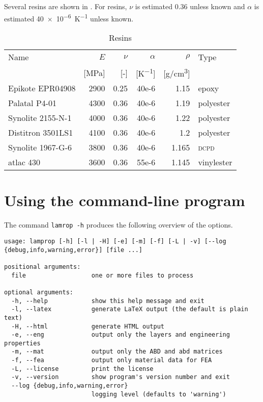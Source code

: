 \documentclass[a4paper,landscape,oneside,11pt,twocolumn]{memoir}
\begin{document}
Several resins are shown in . For resins, $\nu$ is estimated
0.36 unless known and $\alpha$ is estimated \SI{40e-6}{K^{-1}} unless known.

\begin{table}[!htbp]
  \centering
  \caption{\label{tb:resins}Resins}
  \begin{tabular}{lrrrrl}%
      Name & $E$ & $\nu$ & $\alpha$ & $\rho$ & Type\\
      & [\si{MPa}] & [-] & [\si{K^{-1}}] & [\si{g/cm^3}]\\
    \midrule
      Epikote EPR04908 & 2900 & 0.25 & 40e-6 & 1.15 & epoxy\\
      Palatal P4-01 & 4300 & 0.36 & 40e-6 & 1.19 & polyester\\
      Synolite 2155-N-1 & 4000 & 0.36 & 40e-6 & 1.22 & polyester\\
      Distitron 3501LS1 & 4100 & 0.36 & 40e-6 & 1.2 & polyester\\
      Synolite 1967-G-6 & 3800 & 0.36 & 40e-6 & 1.165 & \textsc{dcpd}\\
      atlac 430 & 3600 & 0.36 & 55e-6 & 1.145 & vinylester\\
  \end{tabular}
\end{table}

\section{Using the command-line program} %

The command \texttt{lamrop -h} produces the following overview of the options.

\begin{lstlisting}[style=plain]
usage: lamprop [-h] [-l | -H] [-e] [-m] [-f] [-L | -v] [--log {debug,info,warning,error}] [file ...]

positional arguments:
  file                  one or more files to process

optional arguments:
  -h, --help            show this help message and exit
  -l, --latex           generate LaTeX output (the default is plain text)
  -H, --html            generate HTML output
  -e, --eng             output only the layers and engineering properties
  -m, --mat             output only the ABD and abd matrices
  -f, --fea             output only material data for FEA
  -L, --license         print the license
  -v, --version         show program's version number and exit
  --log {debug,info,warning,error}
                        logging level (defaults to 'warning')
\end{lstlisting}
\end{document}

